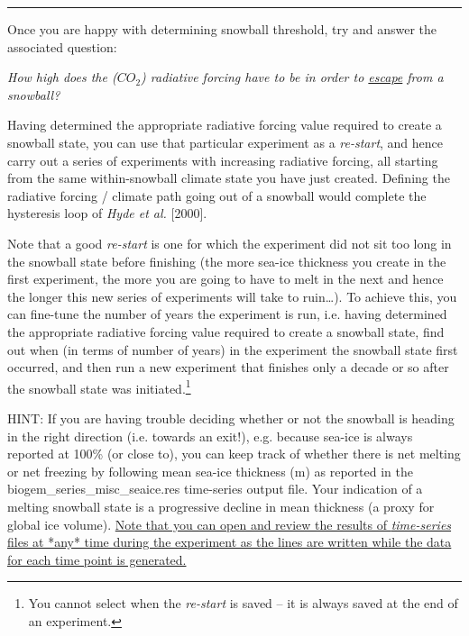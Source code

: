 \vspace{1mm}
\noindent\rule{4cm}{0.5pt}
\vspace{2mm}

\noindent Once you are happy  with determining snowball threshold, try and answer the associated question:

\vspace{2mm}
\noindent \textit{How high does the (\(CO_{2}\)) radiative forcing have to be in order to \uline{escape} from a snowball?}
\vspace{2mm}

\noindent Having determined the appropriate radiative forcing value required to create a snowball state, you can use that particular experiment as a \textit{re-start}, and hence carry out a series of experiments with increasing radiative forcing, all starting from the same within-snowball climate state you have just created. Defining the radiative forcing / climate path going out of a snowball would complete the hysteresis loop of \textit{Hyde et al.} [2000]. 

Note that a good \textit{re-start} is one for which the experiment did not sit too long in the snowball state before finishing (the more sea-ice thickness you create in the first experiment, the more you are going to have to melt in the next and hence the longer this new series of experiments will take to ruin…). To achieve this, you can fine-tune the number of years the experiment is run, i.e. having determined the appropriate radiative forcing value required to create a snowball state, find out when (in terms of number of years) in the experiment the snowball state first occurred, and then run a new experiment that finishes only a decade or so after the snowball state was initiated.\footnote{You cannot select when the \textit{re-start} is saved – it is always saved at the end of an experiment.}

HINT: If you are having trouble deciding whether or not the snowball is heading in the right direction (i.e. towards an exit!), e.g. because sea-ice is always reported at 100\% (or close to), you can keep track of whether there is net melting or net freezing by following mean sea-ice thickness (m) as reported in the \textsf{\footnotesize biogem\_series\_misc\_seaice.res} time-series output file. Your indication of a melting snowball state is a progressive decline in mean thickness (a proxy for global ice volume). \uline{Note that you can open and review the results of \textit{time-series} files at *any* time during the experiment as the lines are written while the data for each time point is generated.}

